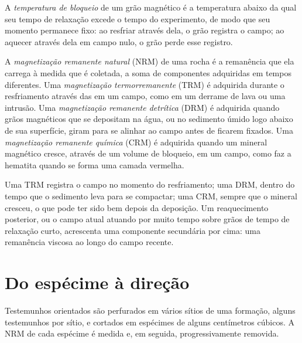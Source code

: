 \begin{definition}\label{def:b3:palaeomagnetism:blocking}
A \emph{temperatura de bloqueio} de um grão magnético
é a temperatura abaixo da qual seu tempo de relaxação excede o tempo do
experimento, de modo que seu momento permanece fixo: ao resfriar através dela, o grão
registra o campo; ao aquecer através dela em campo nulo, o grão perde esse
registro.
\end{definition}

\begin{definition}\label{def:b3:palaeomagnetism:nrm}
A \emph{magnetização remanente natural}
(NRM) de uma rocha é a remanência que ela carrega à medida que é coletada, a soma de
componentes adquiridas em tempos diferentes. Uma \emph{magnetização
termorremanente} (TRM) é adquirida durante o resfriamento
através das  em um campo, como em um derrame de lava ou
uma intrusão. Uma \emph{magnetização remanente detrítica}
(DRM) é adquirida quando grãos magnéticos que se depositam na água, ou no
sedimento úmido logo abaixo de sua superfície, giram para se alinhar ao campo antes de
ficarem fixados. Uma \emph{magnetização remanente química}
(CRM) é adquirida quando um mineral magnético cresce, através de um
volume de bloqueio, em um campo, como faz a hematita quando se forma uma camada vermelha.
\end{definition}

Uma TRM registra o campo no momento do resfriamento; uma DRM, dentro do tempo que o
sedimento leva para se compactar; uma CRM, sempre que o mineral cresceu, o que pode ter sido bem
depois da deposição. Um reaquecimento posterior, ou o campo atual atuando por muito tempo
sobre grãos de tempo de relaxação curto, acrescenta uma componente secundária por cima: uma
remanência viscosa ao longo do campo recente.

\section{Do espécime à direção}

Testemunhos orientados são perfurados em vários sítios de uma formação, alguns testemunhos por
sítio, e cortados em espécimes de alguns centímetros cúbicos. A NRM de cada espécime é
medida e, em seguida, progressivamente removida.

